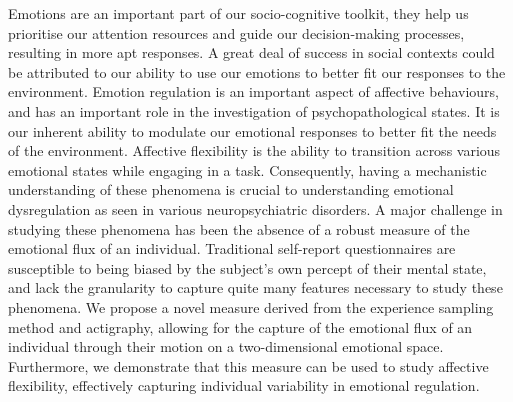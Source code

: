 %
%

Emotions are an important part of our socio-cognitive toolkit, they help us prioritise our attention resources and guide our decision-making processes, resulting in more 
apt responses. A great deal of success in social contexts could be attributed to our ability to use our emotions to better fit our responses to the environment. Emotion 
regulation is an important aspect of affective behaviours, and has an important role in the investigation of psychopathological states. It is our inherent ability to 
modulate our emotional responses to better fit the needs of the environment. Affective flexibility is the ability to transition across various emotional states while 
engaging in a task. Consequently, having a mechanistic understanding of these phenomena is crucial to understanding emotional dysregulation as seen in various 
neuropsychiatric disorders. A major challenge in studying these phenomena has been the absence of a robust measure of the emotional flux of an individual. Traditional 
self-report questionnaires are susceptible to being biased by the subject's own percept of their mental state, and lack the granularity to capture quite many features 
necessary to study these phenomena. We propose a novel measure derived from the experience sampling method and actigraphy, allowing for the capture of the emotional flux 
of an individual through their motion on a two-dimensional emotional space. Furthermore, we demonstrate that this measure can be used to study affective flexibility, 
effectively capturing individual variability in emotional regulation. 



